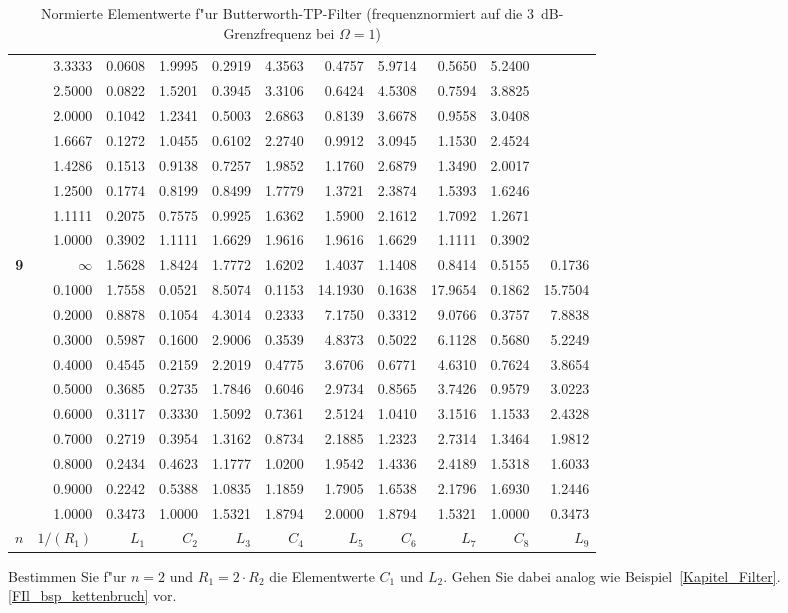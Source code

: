 \begin{table}[!htb]
\begin{center}
{\begin{tabular}{|c||r|r|r|r|r|r|r|r|r|r|}
&3.3333&0.0608&1.9995&0.2919&4.3563&0.4757&5.9714&0.5650&5.2400&     \\
&2.5000&0.0822&1.5201&0.3945&3.3106&0.6424&4.5308&0.7594&3.8825&     \\
&2.0000&0.1042&1.2341&0.5003&2.6863&0.8139&3.6678&0.9558&3.0408&     \\
&1.6667&0.1272&1.0455&0.6102&2.2740&0.9912&3.0945&1.1530&2.4524&     \\
&1.4286&0.1513&0.9138&0.7257&1.9852&1.1760&2.6879&1.3490&2.0017&     \\
&1.2500&0.1774&0.8199&0.8499&1.7779&1.3721&2.3874&1.5393&1.6246&     \\
&1.1111&0.2075&0.7575&0.9925&1.6362&1.5900&2.1612&1.7092&1.2671&     \\
&1.0000&0.3902&1.1111&1.6629&1.9616&1.9616&1.6629&1.1111&0.3902&     \\ \hline
\textbf{ 9}&$\infty$&1.5628&1.8424&1.7772&1.6202&1.4037&1.1408&0.8414&0.5155&0.1736\\
&0.1000&1.7558&0.0521&8.5074&0.1153&14.1930&0.1638&17.9654&0.1862&15.7504\\
&0.2000&0.8878&0.1054&4.3014&0.2333&7.1750&0.3312&9.0766&0.3757&7.8838\\
&0.3000&0.5987&0.1600&2.9006&0.3539&4.8373&0.5022&6.1128&0.5680&5.2249\\
&0.4000&0.4545&0.2159&2.2019&0.4775&3.6706&0.6771&4.6310&0.7624&3.8654\\
&0.5000&0.3685&0.2735&1.7846&0.6046&2.9734&0.8565&3.7426&0.9579&3.0223\\
&0.6000&0.3117&0.3330&1.5092&0.7361&2.5124&1.0410&3.1516&1.1533&2.4328\\
&0.7000&0.2719&0.3954&1.3162&0.8734&2.1885&1.2323&2.7314&1.3464&1.9812\\
&0.8000&0.2434&0.4623&1.1777&1.0200&1.9542&1.4336&2.4189&1.5318&1.6033\\
&0.9000&0.2242&0.5388&1.0835&1.1859&1.7905&1.6538&2.1796&1.6930&1.2446\\
&1.0000&0.3473&1.0000&1.5321&1.8794&2.0000&1.8794&1.5321&1.0000&0.3473\\ \hline
\hline
$n$ & $1/(R_1)$ & $L_1$ & $C_2$ & $L_3$ & $C_4$ & $L_5$ & $C_6$ & $L_7$ & $C_8$ & $L_9$  \\ \hline
\end{tabular}\vspace*{-1mm}\caption{Normierte Elementwerte f"ur Butterworth-TP-Filter (frequenznormiert auf 
die 3~dB-Grenzfrequenz bei $\Omega=1$) \label{el-BW1}}}
\end{center}
\vspace*{-4mm} 
\end{table}%
\vspace*{-9mm} 
\aufg
Bestimmen Sie f"ur $n=2$ und $R_1=2\cdot R_2$ die Elementwerte $C_1$ und $L_2$. Gehen Sie dabei analog wie Beispiel~\ref{Kapitel_Filter}.\ref{FIl_bsp_kettenbruch} vor.
\vspace*{-14mm} 
\clearpage


